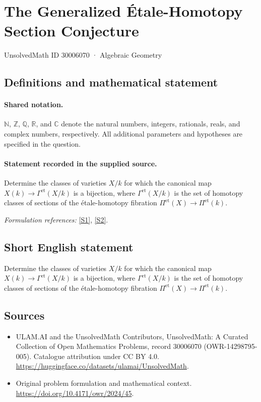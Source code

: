 \documentclass[11pt]{article}
\newcommand{\sref}[2]{\hyperlink{source:#1:#2}{[S#2]}}
\begin{document}
\setcounter{section}{30006069}
\section{The Generalized Étale-Homotopy Section Conjecture}\label{30006070}
{\small UnsolvedMath ID 30006070 · Algebraic Geometry}
\subsection{Definitions and mathematical statement}

\paragraph{Shared notation.}$\mathbb N$, $\mathbb Z$, $\mathbb Q$, $\mathbb R$, and $\mathbb C$ denote the natural numbers, integers, rationals, reals, and complex numbers, respectively. All additional parameters and hypotheses are specified in the question.


\paragraph{Statement recorded in the supplied source.}
Determine the classes of varieties $X/k$ for which the canonical map $X(k)\to\Gamma^{\mathrm{et}}(X/k)$ is a bijection, where $\Gamma^{\mathrm{et}}(X/k)$ is the set of homotopy classes of sections of the étale-homotopy fibration $\Pi^{\mathrm{et}}(X)\to\Pi^{\mathrm{et}}(k)$.
\par\smallskip\textit{Formulation references:} \sref{30006070}{1}, \sref{30006070}{2}.
\subsection{Short English statement}
Determine the classes of varieties $X/k$ for which the canonical map $X(k)\to\Gamma^{\mathrm{et}}(X/k)$ is a bijection, where $\Gamma^{\mathrm{et}}(X/k)$ is the set of homotopy classes of sections of the étale-homotopy fibration $\Pi^{\mathrm{et}}(X)\to\Pi^{\mathrm{et}}(k)$.
\subsection{Sources}
\begin{itemize}
\item[\hypertarget{source:30006070:1}{S1}] ULAM.AI and the UnsolvedMath Contributors, UnsolvedMath: A Curated Collection of Open Mathematics Problems, record 30006070 (OWR-14298795-005). Catalogue attribution under CC BY 4.0.
\url{https://huggingface.co/datasets/ulamai/UnsolvedMath}.
\item[\hypertarget{source:30006070:2}{S2}] Original problem formulation and mathematical context.
\url{https://doi.org/10.4171/owr/2024/45}.
\end{itemize}
\label{end:30006070}
\end{document}

